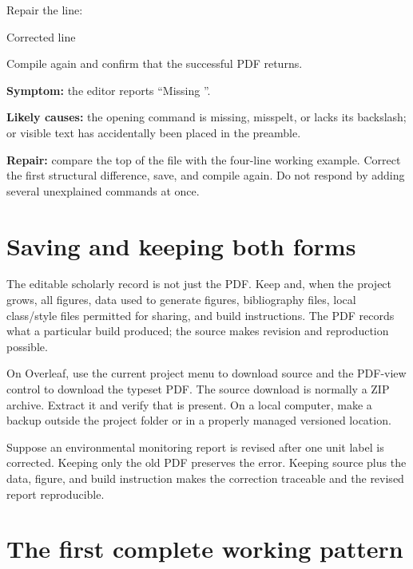 Repair the line:

\begin{latexcode}{Corrected line}

\end{latexcode}

Compile again and confirm that the successful PDF returns.

\begin{commonerror}
\textbf{Symptom:} the editor reports ``Missing ''.

\textbf{Likely causes:} the opening command is missing, misspelt, or lacks its
backslash; or visible text has accidentally been placed in the preamble.

\textbf{Repair:} compare the top of the file with the four-line working
example. Correct the first structural difference, save, and compile again.
Do not respond by adding several unexplained commands at once.
\end{commonerror}

\section{Saving and keeping both forms}

The editable scholarly record is not just the PDF. Keep  and,
when the project grows, all figures, data used to generate figures, bibliography
files, local class/style files permitted for sharing, and build instructions.
The PDF records what a particular build produced; the source makes revision
and reproduction possible.

On Overleaf, use the current project menu to download source and the PDF-view
control to download the typeset PDF. The source download is normally a ZIP
archive. Extract it and verify that  is present. On a local
computer, make a backup outside the project folder or in a properly managed
versioned location.

\begin{scienceinpractice}
Suppose an environmental monitoring report is revised after one unit label is
corrected. Keeping only the old PDF preserves the error. Keeping source plus
the data, figure, and build instruction makes the correction traceable and the
revised report reproducible.
\end{scienceinpractice}

\section{The first complete working pattern}

